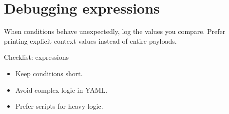 \section{Debugging expressions}
When conditions behave unexpectedly, log the values you compare.
Prefer printing explicit context values instead of entire payloads.

\begin{checklistbox}{Checklist: expressions}
\begin{itemize}[nosep]
  \item Keep conditions short.
  \item Avoid complex logic in YAML.
  \item Prefer scripts for heavy logic.
\end{itemize}
\end{checklistbox}
